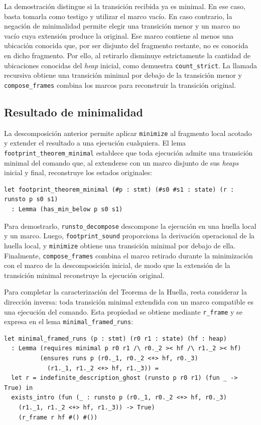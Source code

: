 \documentclass[a4paper,	11pt]{report}
\begin{document}
La demostración distingue si la transición recibida ya es minimal.
En ese caso,
basta tomarla como testigo y utilizar el marco vacío.
En caso contrario,
la negación de minimalidad permite elegir una transición menor y un marco no vacío cuya extensión produce la original.
Ese marco contiene al menos una ubicación conocida que,
por ser disjunto del fragmento restante,
no es conocida en dicho fragmento.
Por ello,
al retirarlo disminuye estrictamente la cantidad de ubicaciones conocidas del \emph{heap} inicial,
como demuestra \lstinline|count_strict|.
La llamada recursiva obtiene una transición minimal por debajo de la transición menor
y \lstinline|compose_frames| combina los marcos para reconstruir la transición original.

\subsection*{Resultado de minimalidad}
La descomposición anterior permite aplicar \lstinline|minimize| al fragmento local acotado y extender el resultado a una ejecución cualquiera.
El lema \lstinline|footprint_theorem_minimal| establece que toda ejecución admite una transición minimal del comando que,
al extenderse con un marco disjunto de sus \emph{heaps} inicial y final,
reconstruye los estados originales:

\begin{lstlisting}
let footprint_theorem_minimal (#p : stmt) (#s0 #s1 : state) (r : runsto p s0 s1)
  : Lemma (has_min_below p s0 s1)
\end{lstlisting}

Para demostrarlo,
\lstinline|runsto_decompose| descompone la ejecución en una huella local y un marco.
Luego,
\lstinline|footprint_sound| proporciona la derivación operacional de la huella local,
y \lstinline|minimize| obtiene una transición minimal por debajo de ella.
Finalmente,
\lstinline|compose_frames| combina el marco retirado durante la minimización con el marco de la descomposición inicial,
de modo que la extensión de la transición minimal reconstruye la ejecución original.

Para completar la caracterización del Teorema de la Huella,
resta considerar la dirección inversa:
toda transición minimal extendida con un marco compatible es una ejecución del comando.
Esta propiedad se obtiene mediante \lstinline|r_frame| y se expresa en el lema \lstinline|minimal_framed_runs|:

\begin{lstlisting}
let minimal_framed_runs (p : stmt) (r0 r1 : state) (hf : heap)
  : Lemma (requires minimal p r0 r1 /\ r0._2 >< hf /\ r1._2 >< hf)
          (ensures runs p (r0._1, r0._2 <+> hf, r0._3) 
            (r1._1, r1._2 <+> hf, r1._3)) =
  let r = indefinite_description_ghost (runsto p r0 r1) (fun _ -> True) in
  exists_intro (fun (_ : runsto p (r0._1, r0._2 <+> hf, r0._3) 
    (r1._1, r1._2 <+> hf, r1._3)) -> True)
    (r_frame r hf #() #())
\end{lstlisting}
\end{document}
